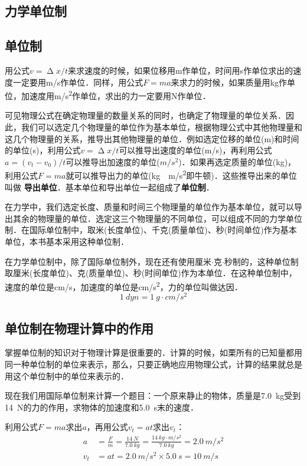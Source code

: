 \begin{Test}
\section{力学单位制}
\subsection{单位制}
用公式$v=\upDelta x/t$来求速度的时候，如果位移用\si{m}作单位，时间用\si{s}作单位求出的速度一定要用\si{m/s}作单位．同样，用公式$F=ma$来求力的时候，如果质量用\si{kg}作单位，加速度用\si{m/s^2}作单位，求出的力一定要用\si{N}作单位．

可见物理公式在确定物理量的数量关系的同时，也确定了物理量的单位关系．因此，我们可以选定几个物理量的单位作为基本单位，根据物理公式中其他物理量和这几个物理量的关系，推导出其他物理量的单位．例如选定位移的单位(\si{m})和时间的单位(\si{s})，利用公式$v=\upDelta x/t$可以推导出速度的单位(\si{m/s})，再利用公式$a=(v_t-v_0)/t$可以推导出加速度的单位($\si{m/s^2}$)．如果再选定质量的单位(\si{kg})，利用公式$F=ma$就可以推导出力的单位(\si{kg \cdot m/s^2}即牛顿)．这些推导出来的单位叫做\textbf{ 导出单位}．基本单位和导出单位一起组成了\textbf{单位制}．

在力学中，我们选定长度、质量和时间三个物理量的单位作为基本单位，就可以导出其余的物理量的单位．选定这三个物理量的不同单位，可以组成不同的力学单位制．在国际单位制中，取米(长度单位)、千克(质量单位)、秒(时间单位)作为基本单位，本书基本采用这种单位制．

在力学单位制中，除了国际单位制外，现在还有使用厘米$\cdot$克$\cdot$秒制的，这种单位制取厘米(长度单位)、克(质量单位)、秒(时间单位)作为本单位．在这种单位制中，速度的单位是\si{cm/s}，加速度的单位是\si{cm/s^2}，力的单位叫做达因．
\[\SI{1}{dyn}=\SI{1}{g\cdot cm/s^2}  \]


\subsection{单位制在物理计算中的作用}
掌握单位制的知识对于物理计算是很重要的．计算的时候，如栗所有的已知量都用同一种单位制的单位来表示，那么，只要正确地应用物理公式，计算的结果就总是用这个单位制中的单位来表示的．

现在我们用国际单位制来计算一个题目：一个原来静止的物体，质量是\SI{7.0}{kg}受到\SI{14}{N}的力的作用，求物体的加速度和\SI{5.0}{s}末的速度．

利用公式$F= ma$求出$a$，再用公式$v_t= at$求出$v_t$：
\[\begin{split}
        a   & =\frac{F}{m}=\frac{\SI{14}{N}}{\SI{7.0}{kg}}=\frac{\SI{14}{kg\cdot m/s^2}}{\SI{7.0}{kg}}=\SI{2.0}{m/s^2} \\
        v_t & =at=\SI{2.0}{m/s^2} \times \SI{5.0}{s}=\SI{10}{m/s}
    \end{split} \]


\end{Test}
